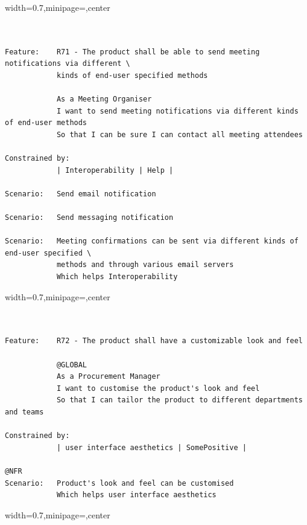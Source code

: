 \documentclass[dissertation,final]{softeng}
\newenvironment{featurecode}[1]
{ \lrbox\featurebox \begin{adjustbox}{width=#1\textwidth,minipage=\textwidth,center} }
{ \end{adjustbox}\endlrbox}
\newenvironment{featurelist}[2]
{
\newcommand{\setcaption}{\caption{#1}}
\newcommand{\setlabel}{\label{#2}}
}
{\begin{listing}[h!]\centering\usebox\featurebox\setcaption\setlabel\end{listing}}
\begin{document}
\begin{appendices}
\begin{featurelist}{R71 -- The product shall be able to send meeting notifications...}{lst:feature_r71}
\begin{featurecode}{0.7}
\begin{verbatim}


Feature:    R71 - The product shall be able to send meeting notifications via different \
            kinds of end-user specified methods

            As a Meeting Organiser
            I want to send meeting notifications via different kinds of end-user methods
            So that I can be sure I can contact all meeting attendees
	
Constrained by:
            | Interoperability | Help |

Scenario:   Send email notification

Scenario:   Send messaging notification

Scenario:   Meeting confirmations can be sent via different kinds of end-user specified \
            methods and through various email servers
            Which helps Interoperability
\end{verbatim}
\end{featurecode}
\end{featurelist}


\begin{featurelist}{R72 -- The product shall have a customizable look and feel}{lst:feature_r72}
\begin{featurecode}{0.7}
\begin{verbatim}


Feature:    R72 - The product shall have a customizable look and feel
			
            @GLOBAL
            As a Procurement Manager
            I want to customise the product's look and feel
            So that I can tailor the product to different departments and teams
	
Constrained by:
            | user interface aesthetics | SomePositive |

@NFR
Scenario:   Product's look and feel can be customised
            Which helps user interface aesthetics
\end{verbatim}
\end{featurecode}
\end{featurelist}

\begin{featurelist}{R74 -- The product will display availability for unreserved conference rooms}{lst:feature_r74}
\begin{featurecode}{0.7}
\begin{verbatim}



\end{verbatim}
\end{featurecode}
\end{featurelist}
\end{appendices}
\end{document}
